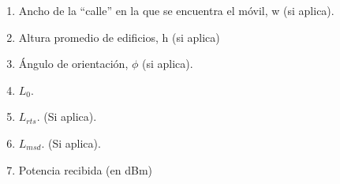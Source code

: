 \begin{enumerate}
\begin{enumerate}
		      \item Ancho de la “calle” en la que se encuentra el móvil, w (si aplica).
		      \item Altura promedio de edificios, h (si aplica)
		      \item Ángulo de orientación, $\phi$ (si aplica).
		      \item $L_0.$
		      \item $L_{rts}$. (Si aplica).
		      \item $L_{msd}$. (Si aplica).
		      \item Potencia recibida (en dBm)
	      \end{enumerate}
	      \begin{table}[H]
		      \centering
		      \caption{Parámetros de propagación para diferentes ubicaciones}
		      \label{tab:parametros_propagacion}
	      \end{table}


\end{enumerate}